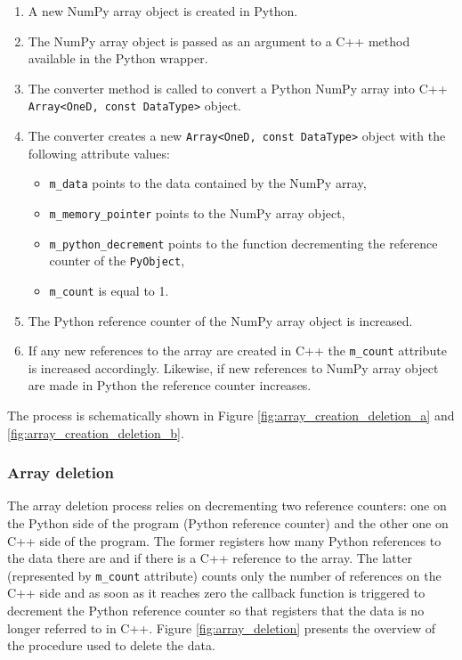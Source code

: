 \begin{enumerate}
    \item A new NumPy array object is created in Python.
    \item The NumPy array object is passed as an argument to a C++ method available in 
        the Python wrapper.
    \item The converter method is called to convert a Python NumPy array into C++ 
        \texttt{Array<OneD, const DataType>} object.
    \item The converter creates a new \texttt{Array<OneD, const DataType>} object with the 
        following attribute values:
    \begin{itemize}
        \item \texttt{m\_data} points to the data contained by the NumPy array,
        \item \texttt{m\_memory\_pointer} points to the NumPy array object,
        \item \texttt{m\_python\_decrement} points to the function decrementing the 
            reference counter of the \texttt{PyObject},
        \item \texttt{m\_count} is equal to 1.
    \end{itemize}
    \item The Python reference counter of the NumPy array object is increased.
    \item If any new references to the array are created in C++ the \texttt{m\_count} 
        attribute is increased accordingly. Likewise, if new references to NumPy array 
        object are made in Python the reference counter increases.
\end{enumerate}

The process is schematically shown in Figure \ref{fig:array_creation_deletion_a} 
and \ref{fig:array_creation_deletion_b}.

\subsubsection{Array deletion}

The array deletion process relies on decrementing two reference counters: one 
on the Python side of the program (Python reference counter) and the other one 
on C++ side of the program. The former registers how many Python references to 
the data there are and if there is a C++ reference to the array. The latter 
(represented by \texttt{m\_count} attribute) counts only the number of references 
on the C++ side and as soon as it reaches zero the callback function is triggered to 
decrement the Python reference counter so that registers that the data is no longer 
referred to in C++. Figure \ref{fig:array_deletion} presents the overview of the 
procedure used to delete the data.

